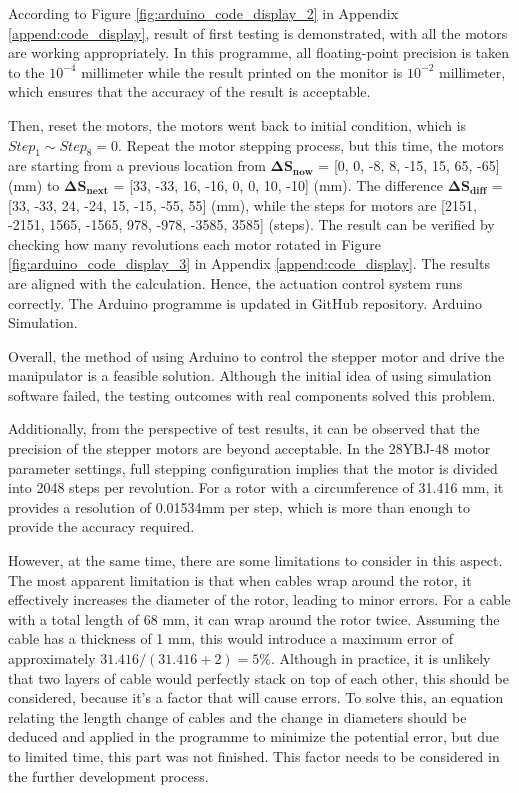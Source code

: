 According to Figure \ref{fig:arduino_code_display_2} in Appendix \ref{append:code_display}, result of first testing 
is demonstrated, with all the motors are working appropriately. In this programme, all floating-point precision 
is taken to the $10^{-4}$ millimeter while the result printed on the monitor is $10^{-2}$ millimeter, 
which ensures that the accuracy of the result is acceptable.

Then, reset the motors, the motors went back to initial condition, which is $Step_1 \sim Step_8=0$. Repeat the 
motor stepping process, but this time, the motors are starting from a previous location from
$\boldsymbol{\Delta S_{now}}$ = [0, 0, -8, 8, -15, 15, 65, -65] (mm) to $\boldsymbol{\Delta S_{next}}$ = 
[33, -33, 16, -16, 0, 0, 10, -10] (mm). The difference $\boldsymbol{\Delta S_{diff}}$ = 
[33, -33, 24, -24, 15, -15, -55, 55] (mm), while the steps for motors are 
[2151, -2151, 1565, -1565, 978, -978, -3585, 3585] (steps). The result can be verified by checking how many 
revolutions each motor rotated in Figure \ref{fig:arduino_code_display_3} in Appendix \ref{append:code_display}.
The results are aligned with the calculation. Hence, the actuation control system runs correctly.
The Arduino programme is updated in GitHub repository.
{Arduino Simulation}.

Overall, the method of using Arduino to control the stepper motor and drive the manipulator is a feasible solution. 
Although the initial idea of using simulation software failed, the testing outcomes with real components solved this problem.

Additionally, from the perspective of test results, it can be observed that the precision of the stepper motors are 
beyond acceptable. In the 28YBJ-48 motor parameter settings, full stepping configuration implies that the motor is divided into 
2048 steps per revolution. For a rotor with a circumference of 31.416 mm, it provides a resolution of 
0.01534mm per step, which is more than enough to provide the accuracy required.

However, at the same time, there are some limitations to consider in this aspect. The most apparent limitation is that 
when cables wrap around the rotor, it effectively increases the diameter of the rotor, leading to minor errors. For a 
cable with a total length of 68 mm, it can wrap around the rotor twice. Assuming the cable has a thickness of 1 mm, this 
would introduce a maximum error of approximately $ 31.416 / (31.416 + 2) = 5\% $. Although in practice, it is unlikely 
that two layers of cable would perfectly stack on top of each other, this should be considered, because it's a factor 
that will cause errors. To solve this, an equation relating the length change of cables and the change in diameters 
should be deduced and applied in the programme to minimize the potential error, but due to limited time, this part was 
not finished. This factor needs to be considered in the further development process.

